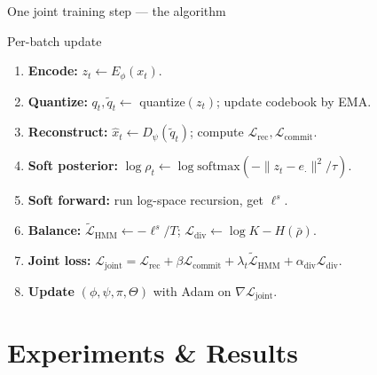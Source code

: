 \documentclass[aspectratio=169,10pt]{beamer}
\newcommand{\Lcal}{\mathcal{L}}
\begin{document}
\begin{frame}{One joint training step --- the algorithm}
  \begin{block}{Per-batch update}
  \begin{enumerate}\setlength\itemsep{0.15em}
    \item \textbf{Encode:} $z_t \gets E_\phi(x_t)$.
    \item \textbf{Quantize:} $q_t, \tilde q_t \gets$ quantize$(z_t)$; update codebook by EMA.
    \item \textbf{Reconstruct:} $\hat x_t \gets D_\psi(\tilde q_t)$;
          compute $\Lcal_{\text{rec}}, \Lcal_{\text{commit}}$.
    \item \textbf{Soft posterior:}
          $\log\rho_t \gets \log\mathrm{softmax}(-\|z_t - e_\cdot\|^2/\tau)$.
    \item \textbf{Soft forward:} run log-space recursion, get $\ell^{s}$.
    \item \textbf{Balance:}
          $\widetilde{\Lcal}_{\text{HMM}} \gets -\ell^{s}/T$;\;
          $\Lcal_{\text{div}} \gets \log K - H(\bar\rho)$.
    \item \textbf{Joint loss:}
          $\Lcal_{\text{joint}} = \Lcal_{\text{rec}} + \beta \Lcal_{\text{commit}} + \lambda_t \widetilde{\Lcal}_{\text{HMM}} + \alpha_{\text{div}} \Lcal_{\text{div}}$.
    \item \textbf{Update} $(\phi, \psi, \pi, \Theta)$ with Adam on $\nabla\Lcal_{\text{joint}}$.
  \end{enumerate}
  \end{block}
\end{frame}

\section{Experiments \& Results}
\end{document}
